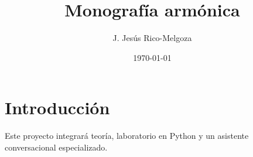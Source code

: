 \documentclass[11pt]{book}
\title{Monografía armónica}
\author{J. Jesús Rico-Melgoza}
\date{\today}
\begin{document}
\maketitle
\tableofcontents

\chapter{Introducción}
Este proyecto integrará teoría, laboratorio en Python y un asistente conversacional especializado.
\end{document}
